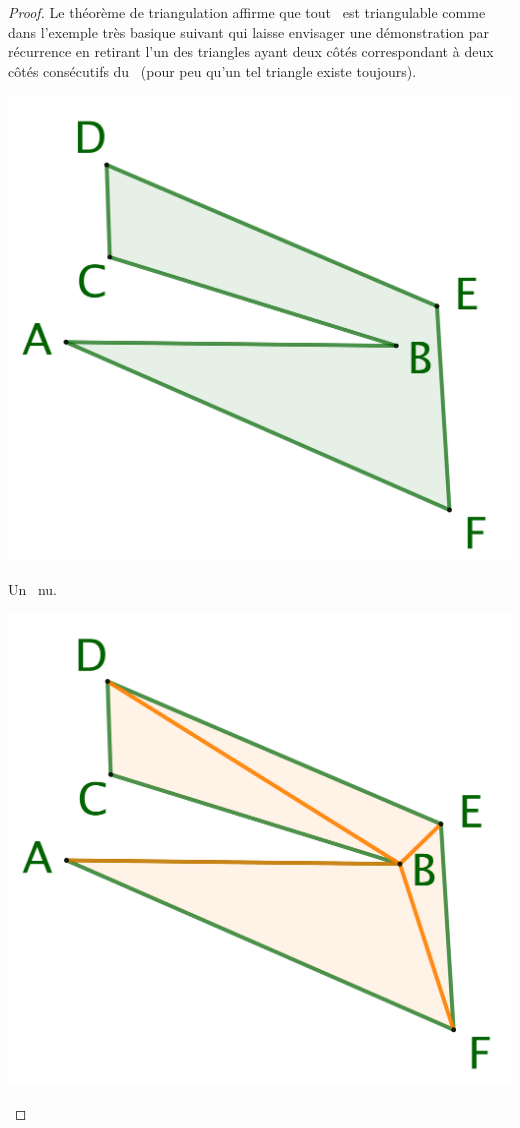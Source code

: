 \begin{proof}
	Le théorème de triangulation affirme que tout \ngone\ est triangulable comme dans l'exemple très basique suivant qui laisse envisager une démonstration par récurrence en retirant l'un des triangles ayant deux côtés correspondant à deux côtés consécutifs du \ngone\ (pour peu qu'un tel triangle existe toujours).

    
    \begin{multicols}{3}
        \small\itshape
        \begin{center}
            \includegraphics[scale=.4]{content/polygon/sufficient-cond/triangulation-1.png}
        
            \smallskip
            Un \ngone\ nu.
        \end{center}

    
        \begin{center}
            \includegraphics[scale=.4]{content/polygon/sufficient-cond/triangulation-2.png}
        

\end{center}
\end{multicols}
\end{proof}
